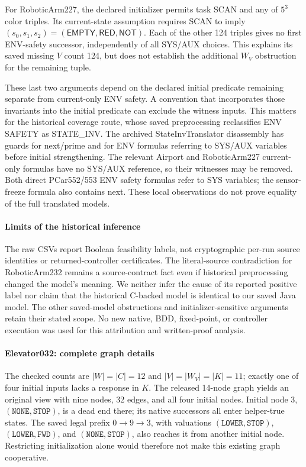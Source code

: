 \documentclass[11pt]{article}
\begin{document}
For RoboticArm227, the declared initializer permits task SCAN and any
of $5^3$ color triples. Its current-state assumption requires SCAN to imply
$(s_0,s_1,s_2)=(\mathsf{EMPTY},\mathsf{RED},\mathsf{NOT})$.
Each of the other 124 triples gives no first ENV-safety successor,
independently of all SYS/AUX choices. This explains its saved missing
$V$ count 124, but does not establish the additional $W_V$ obstruction
for the remaining tuple.

These last two arguments depend on the declared initial predicate
remaining separate from current-only ENV safety. A convention that
incorporates those invariants into the initial predicate can exclude
the witness inputs. This matters for the historical coverage route,
whose saved preprocessing reclassifies ENV SAFETY as STATE\_INV.
The archived StateInvTranslator disassembly has guards for next/prime
and for ENV formulas referring to SYS/AUX variables before initial
strengthening. The relevant Airport and RoboticArm227 current-only
formulas have no SYS/AUX reference, so their witnesses may be removed.
Both direct PCar552/553 ENV safety formulas refer to SYS variables;
the sensor-freeze formula also contains next. These local observations
do not prove equality of the full translated models.

\paragraph{Limits of the historical inference}
The raw CSVs report Boolean feasibility labels, not cryptographic
per-run source identities or returned-controller certificates. The
literal-source contradiction for RoboticArm232 remains a source-contract
fact even if historical preprocessing changed the model's meaning.
We neither infer the cause of its reported positive label nor claim
that the historical C-backed model is identical to our saved Java model.
The other saved-model obstructions and initializer-sensitive arguments
retain their stated scope. No new native, BDD, fixed-point, or controller
execution was used for this attribution and written-proof analysis.

\paragraph{Elevator032: complete graph details}
The checked counts are $|W|=|C|=12$ and $|V|=|W_V|=|K|=11$;
exactly one of four initial inputs lacks a response in $K$.
The released 14-node graph yields an original view with nine nodes,
32 edges, and all four initial nodes. Initial node 3,
$(\texttt{NONE},\texttt{STOP})$, is a dead end there; its native
successors all enter helper-true states. The saved legal prefix
$0\to9\to3$, with valuations $(\texttt{LOWER},\texttt{STOP})$,
$(\texttt{LOWER},\texttt{FWD})$, and $(\texttt{NONE},\texttt{STOP})$,
also reaches it from another initial node. Restricting initialization
alone would therefore not make this existing graph cooperative.
\end{document}
